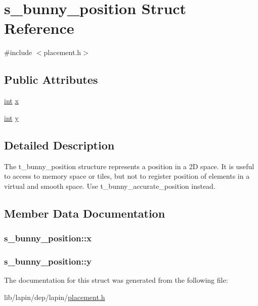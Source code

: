 \hypertarget{structs__bunny__position}{\section{s\-\_\-bunny\-\_\-position Struct Reference}
\label{structs__bunny__position}
}


{\ttfamily \#include $<$placement.\-h$>$}

\subsection*{Public Attributes}
\begin{DoxyCompactItemize}
\item 
\hyperlink{term__entry_8h_ad65b480f8c8270356b45a9890f6499ae}{int} \hyperlink{structs__bunny__position_a68a40fa63c3c199efa358bcbb1ca7c7f}{x}
\item 
\hyperlink{term__entry_8h_ad65b480f8c8270356b45a9890f6499ae}{int} \hyperlink{structs__bunny__position_aeb17e4798f78abbcb2afd14b9ab28a8b}{y}
\end{DoxyCompactItemize}


\subsection{Detailed Description}
The t\-\_\-bunny\-\_\-position structure represents a position in a 2\-D space. It is useful to access to memory space or tiles, but not to register position of elements in a virtual and smooth space. Use t\-\_\-bunny\-\_\-accurate\-\_\-position instead. 

\subsection{Member Data Documentation}
\hypertarget{structs__bunny__position_a68a40fa63c3c199efa358bcbb1ca7c7f}{
\subsubsection[{x}]{ s\-\_\-bunny\-\_\-position\-::x}}\label{structs__bunny__position_a68a40fa63c3c199efa358bcbb1ca7c7f}
\hypertarget{structs__bunny__position_aeb17e4798f78abbcb2afd14b9ab28a8b}{
\subsubsection[{y}]{ s\-\_\-bunny\-\_\-position\-::y}}\label{structs__bunny__position_aeb17e4798f78abbcb2afd14b9ab28a8b}


The documentation for this struct was generated from the following file\-:\begin{DoxyCompactItemize}
\item 
lib/lapin/dep/lapin/\hyperlink{placement_8h}{placement.\-h}\end{DoxyCompactItemize}
